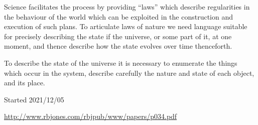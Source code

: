 \documentclass[10pt,titlepage]{book}
\begin{document}
Science facilitates the process by providing ``laws'' which describe regularities in the behaviour of the world which can be exploited in the construction and execution of such plans.
To articulate laws of nature we need language suitable for precisely describing the state if the universe, or some part of it, at one moment, and thence describe how the state evolves over time thenceforth.

To describe the state of the universe it is necessary to enumerate the things which occur in the system, describe carefully the nature and state of each object, and its place.


{}





Started 2021/12/05


\href{http://www.rbjones.com/rbjpub/www/papers/p034.pdf}{http://www.rbjones.com/rbjpub/www/papers/p034.pdf}

\end{document}
